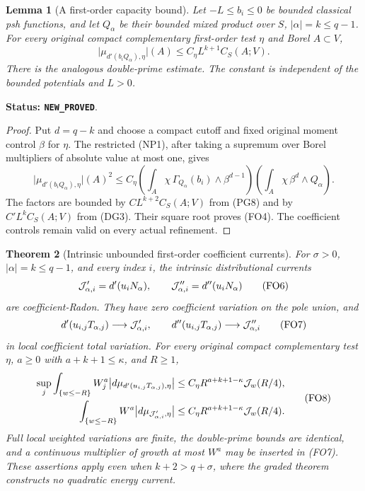 \documentclass[11pt,a4paper]{article}
\numberwithin{equation}{section}
\newtheorem{theorem}{Theorem}[section]
\newtheorem{lemma}[theorem]{Lemma}
\theoremstyle{definition}
\theoremstyle{remark}
\begin{document}
\begin{lemma}[A first-order capacity bound]
\label{lem:r11-first-order-capacity-bound}
Let $-L\leq b_i\leq0$ be bounded classical psh functions,
and let $Q_\alpha$ be their bounded mixed product over $S$,
$|\alpha|=k\leq q-1$. For every original compact
complementary first-order test $\eta$ and Borel $A\subset V$,
\[
 \bigl|\mu_{d'(b_iQ_\alpha),\eta}\bigr|(A)
                  \leq C_\eta L^{k+1}C_S(A;V).
 \tag{FO4}
\]
There is the analogous double-prime estimate. The constant
is independent of the bounded potentials and $L>0$.
\end{lemma}

\noindent\textbf{Status: \texttt{NEW\_PROVED}}.

\begin{proof}
Put $d=q-k$ and choose a compact cutoff and fixed original
moment control $\beta$ for $\eta$. The restricted (NP1),
after taking a supremum over Borel multipliers of absolute
value at most one, gives
\[
 \bigl|\mu_{d'(b_iQ_\alpha),\eta}\bigr|(A)^2
 \leq C_\eta
       \left(\int_A\chi\,\Gamma_{Q_\alpha}(b_i)
                                  \wedge\beta^{d-1}\right)
       \left(\int_A\chi\,\beta^d\wedge Q_\alpha\right).
 \tag{FO5}
\]
The factors are bounded by $CL^{k+2}C_S(A;V)$ from
(PG8) and by $C'L^kC_S(A;V)$ from (DG3).
Their square root proves (FO4). The coefficient controls
remain valid on every actual refinement.
\end{proof}

\begin{theorem}[Intrinsic unbounded first-order coefficient currents]
\label{thm:r11-unbounded-first-order}
For $\sigma>0$, $|\alpha|=k\leq q-1$, and every index $i$,
the intrinsic distributional currents
\[
 {\cal J}'_{\alpha,i}=d'(u_iN_\alpha),\qquad
 {\cal J}''_{\alpha,i}=d''(u_iN_\alpha)
 \tag{FO6}
\]
are coefficient-Radon. They have zero coefficient variation
on the pole union, and
\[
 d'(u_{i,j}T_{\alpha,j})\longrightarrow{\cal J}'_{\alpha,i},
 \qquad
 d''(u_{i,j}T_{\alpha,j})\longrightarrow{\cal J}''_{\alpha,i}
 \tag{FO7}
\]
in local coefficient total variation.
For every original compact complementary test $\eta$,
$a\geq0$ with $a+k+1\leq\kappa$, and $R\geq1$,
\[
 \begin{split}
 \sup_j\int_{\{w\leq-R\}}W_j^a
       \bigl|d\mu_{d'(u_{i,j}T_{\alpha,j}),\eta}\bigr|
     &\leq C_\eta R^{a+k+1-\kappa}{\cal J}_w(R/4),\\
 \int_{\{w\leq-R\}}W^a
       \bigl|d\mu_{{\cal J}'_{\alpha,i},\eta}\bigr|
     &\leq C_\eta R^{a+k+1-\kappa}{\cal J}_w(R/4).
 \end{split}
 \tag{FO8}
\]
Full local weighted variations are finite, the double-prime
bounds are identical, and a continuous multiplier of growth
at most $W^a$ may be inserted in (FO7).
These assertions apply even when $k+2>q+\sigma$, where
the graded theorem constructs no quadratic energy current.
\end{theorem}
\end{document}
